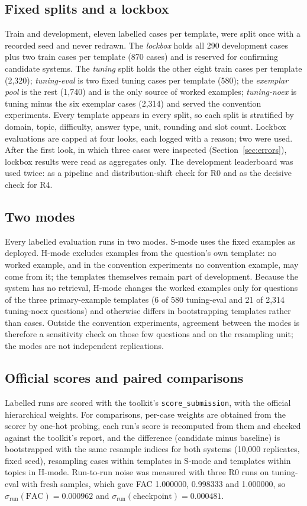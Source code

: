 \documentclass[conference]{IEEEtran}
\newcommand{\id}[1]{\texttt{#1}}
\begin{document}
\subsection{Fixed splits and a lockbox}\label{sec:splits}
Train and development, eleven labelled cases per template, were split once with a recorded seed and never redrawn. The \emph{lockbox} holds all 290 development cases plus two train cases per template (870 cases) and is reserved for confirming candidate systems. The \emph{tuning} split holds the other eight train cases per template (2,320); \emph{tuning-eval} is two fixed tuning cases per template (580); the \emph{exemplar pool} is the rest (1,740) and is the only source of worked examples; \emph{tuning-noex} is tuning minus the six exemplar cases (2,314) and served the convention experiments. Every template appears in every split, so each split is stratified by domain, topic, difficulty, answer type, unit, rounding and slot count. Lockbox evaluations are capped at four looks, each logged with a reason; two were used. After the first look, in which three cases were inspected (Section~\ref{sec:errors}), lockbox results were read as aggregates only. The development leaderboard was used twice: as a pipeline and distribution-shift check for R0 and as the decisive check for R4.

\subsection{Two modes}
Every labelled evaluation runs in two modes. S-mode uses the fixed examples as deployed. H-mode excludes examples from the question's own template: no worked example, and in the convention experiments no convention example, may come from it; the templates themselves remain part of development. Because the system has no retrieval, H-mode changes the worked examples only for questions of the three primary-example templates (6 of 580 tuning-eval and 21 of 2,314 tuning-noex questions) and otherwise differs in bootstrapping templates rather than cases. Outside the convention experiments, agreement between the modes is therefore a sensitivity check on those few questions and on the resampling unit; the modes are not independent replications.

\subsection{Official scores and paired comparisons}\label{sec:compare}
Labelled runs are scored with the toolkit's \id{score\_submission}, with the official hierarchical weights. For comparisons, per-case weights are obtained from the scorer by one-hot probing, each run's score is recomputed from them and checked against the toolkit's report, and the difference (candidate minus baseline) is bootstrapped with the same resample indices for both systems (10,000 replicates, fixed seed), resampling cases within templates in S-mode and templates within topics in H-mode. Run-to-run noise was measured with three R0 runs on tuning-eval with fresh samples, which gave FAC 1.000000, 0.998333 and 1.000000, so $\sigma_{\mathrm{run}}(\mathrm{FAC})=0.000962$ and $\sigma_{\mathrm{run}}(\mathrm{checkpoint})=0.000481$.
\end{document}
